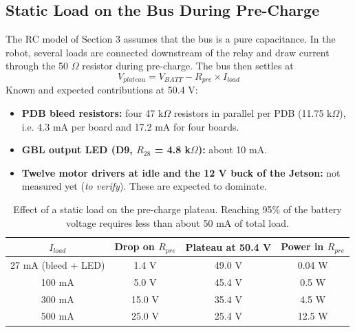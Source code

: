 \documentclass[11pt,a4paper]{article}
\begin{document}
\subsection{Static Load on the Bus During Pre-Charge}
\label{sec:review_load}

The RC model of Section 3 assumes that the bus is a pure capacitance. In the robot, several loads are connected downstream of the relay and draw current through the 50 $\Omega$ resistor during pre-charge. The bus then settles at
\begin{equation}
V_{plateau} = V_{BATT} - R_{pre} \times I_{load}
\end{equation}
Known and expected contributions at 50.4 V:
\begin{itemize}
    \item \textbf{PDB bleed resistors:} four 47 k$\Omega$ resistors in parallel per PDB (11.75 k$\Omega$), i.e. 4.3 mA per board and 17.2 mA for four boards.
    \item \textbf{GBL output LED (D9, $R_{28}$ = 4.8 k$\Omega$):} about 10 mA.
    \item \textbf{Twelve motor drivers at idle and the 12 V buck of the Jetson:} not measured yet (\textit{to verify}). These are expected to dominate.
\end{itemize}

\begin{table}[H]
\centering
\begin{tabular}{cccc}
\toprule
$I_{load}$ & Drop on $R_{pre}$ & Plateau at 50.4 V & Power in $R_{pre}$ \\
\midrule
27 mA (bleed + LED) & 1.4 V & 49.0 V & 0.04 W \\
100 mA & 5.0 V & 45.4 V & 0.5 W \\
300 mA & 15.0 V & 35.4 V & 4.5 W \\
500 mA & 25.0 V & 25.4 V & 12.5 W \\
\bottomrule
\end{tabular}
\caption{Effect of a static load on the pre-charge plateau. Reaching 95\% of the battery voltage requires less than about 50 mA of total load.}
\end{table}
\end{document}
